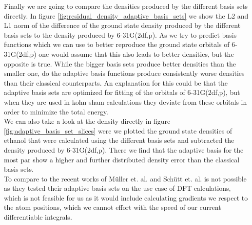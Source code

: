 Finally we are going to compare the densities produced by the different basis sets directly. In figure \ref{fig:residual_density_adaptive_basis_sets} we show the L2 and L1 norm of the difference of the ground state density produced by the different basis sets to the density produced by 6-31G(2df,p).
As we try to predict basis functions which we can use to better reproduce the ground state orbitals of 6-31G(2df,p) one would assume that this also leads to better densities, but the opposite is true.
While the bigger basis sets produce better densities than the smaller one, do the adaptive basis functions produce consistently worse densities than their classical counterparts.
An explanation for this could be that the adaptive basis sets are optimized for fitting of the orbitals of 6-31G(2df,p), but when they are used in kohn sham calculations they deviate from these orbitals in order to minimize the total energy.\\
We can also take a look at the density directly in figure \ref{fig:adaptive_basis_set_slices} were we plotted the ground state densities of ethanol that were calculated using the different basis sets and subtracted the density produced by 6-31G(2df,p).
There we find that  the adaptive basis  for the most par show a higher and further distributed density error than the classical basis sets.\\
To compare to the recent works of Müller et. al.\cite{muller_atom--molecule_2023} and Schütt et. al.\cite{schutt_machine_2018} is not possible as they tested their adaptive basis sets on the use case of DFT calculations, which is not feasible for us as it would include calculating gradients we respect to the atom positions, which we cannot effort with the speed of our  current differentiable integrals.
